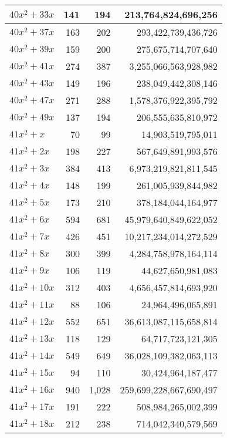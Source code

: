\documentclass[a4paper]{amsproc}
\theoremstyle{plain}
\theoremstyle{named}
\begin{document}
\begin{longtable}{ | l | r | r | r | }
$40x^2 + 33x$ & 141 & 194 & 213{,}764{,}824{,}696{,}256 \\ \hline
$40x^2 + 37x$ & 163 & 202 & 293{,}422{,}739{,}436{,}726 \\ \hline
$40x^2 + 39x$ & 159 & 200 & 275{,}675{,}714{,}707{,}640 \\ \hline
$40x^2 + 41x$ & 274 & 387 & 3{,}255{,}066{,}563{,}928{,}982 \\ \hline
$40x^2 + 43x$ & 149 & 196 & 238{,}049{,}442{,}308{,}146 \\ \hline
$40x^2 + 47x$ & 271 & 288 & 1{,}578{,}376{,}922{,}395{,}792 \\ \hline
$40x^2 + 49x$ & 137 & 194 & 206{,}555{,}635{,}810{,}972 \\ \hline
$41x^2 + x$ & 70 & 99 & 14{,}903{,}519{,}795{,}011 \\ \hline
$41x^2 + 2x$ & 198 & 227 & 567{,}649{,}891{,}993{,}576 \\ \hline
$41x^2 + 3x$ & 384 & 413 & 6{,}973{,}219{,}821{,}811{,}545 \\ \hline
$41x^2 + 4x$ & 148 & 199 & 261{,}005{,}939{,}844{,}982 \\ \hline
$41x^2 + 5x$ & 173 & 210 & 378{,}184{,}044{,}164{,}977 \\ \hline
$41x^2 + 6x$ & 594 & 681 & 45{,}979{,}640{,}849{,}622{,}052 \\ \hline
$41x^2 + 7x$ & 426 & 451 & 10{,}217{,}234{,}014{,}272{,}529 \\ \hline
$41x^2 + 8x$ & 300 & 399 & 4{,}284{,}758{,}978{,}164{,}114 \\ \hline
$41x^2 + 9x$ & 106 & 119 & 44{,}627{,}650{,}981{,}083 \\ \hline
$41x^2 + 10x$ & 312 & 403 & 4{,}656{,}457{,}814{,}693{,}920 \\ \hline
$41x^2 + 11x$ & 88 & 106 & 24{,}964{,}496{,}065{,}891 \\ \hline
$41x^2 + 12x$ & 552 & 651 & 36{,}613{,}087{,}115{,}658{,}814 \\ \hline
$41x^2 + 13x$ & 118 & 129 & 64{,}717{,}723{,}121{,}305 \\ \hline
$41x^2 + 14x$ & 549 & 649 & 36{,}028{,}109{,}382{,}063{,}113 \\ \hline
$41x^2 + 15x$ & 94 & 110 & 30{,}424{,}964{,}187{,}477 \\ \hline
$41x^2 + 16x$ & 940 & 1{,}028 & 259{,}699{,}228{,}667{,}690{,}497 \\ \hline
$41x^2 + 17x$ & 191 & 222 & 508{,}984{,}265{,}002{,}399 \\ \hline
$41x^2 + 18x$ & 212 & 238 & 714{,}042{,}340{,}579{,}569 \\ \hline

\end{longtable}
\end{document}
